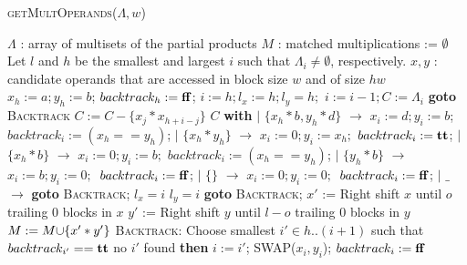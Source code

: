 \begin{algorithm}[!t]
 \caption{\textsc{getMultOperands}($\Lambda,w$)}
 \label{alg:operand}
 \begin{algorithmic}[1]
   \Require $\Lambda$ : array of multisets of the partial products
   \Ensure $M$ : matched multiplications := $\emptyset$
   \State Let $l$ and $h$ be the smallest and largest $i$ such that $\Lambda_i\neq \emptyset$, respectively.
   \State $x,y$ : candidate operands that are accessed in block size $w$ and of size $hw$
   \State $x_h := a; y_h := b$; $backtrack_h := \mathbf{ff}$; 
   \Else
   \State \Return{ $\emptyset$}
   \EndIf
   \State $i := h;l_x := h; l_y = h;$
   \State $i := i - 1; C := \Lambda_i$
    {\bf goto }{\textsc{Backtrack}}
   \State $C := C - \{x_j*x_{h+i-j}\}$
   \EndIf
   \EndFor
    $C$ {\bf with}
   \State\quad $\mid$ $\{x_h*b,y_h*d\}$ $\rightarrow$ $x_i := d; y_i := b$;
   $backtrack_i := (x_h == y_h)$; 
   \State\quad $\mid$ $\{x_h*y_h\}$ $\rightarrow$ $x_i := 0; y_i := x_h;$
   $backtrack_i := \mathbf{tt}$; 
   \State \quad$\mid$ $\{x_h*b\}$ $\rightarrow$ $x_i := 0; y_i := b;$
   $backtrack_i := (x_h == y_h)$; 
   \State \quad $\mid$ $\{y_h*b\}$ $\rightarrow$ $x_i := b; y_i := 0;$\
   $backtrack_i := \mathbf{ff}$; 
   \State \quad $\mid$ $\{\}$ $\rightarrow$ $x_i := 0; y_i := 0;$\
   $backtrack_i := \mathbf{ff}$; 
   \State \quad $\mid$ $\_$ $\rightarrow$ {\bf goto }{\textsc{Backtrack}};
   \IIf{$x_i \neq 0$} $l_x = i$
   \IIf{$y_i \neq 0$} $l_y = i$
    {\bf goto }{\textsc{Backtrack}};
   \If{ $i == 1 $}
   \For{$o \in 0..(l-1)$} %
   \State $x'$ := Right shift $x$ until $o$ trailing $0$ blocks in $x$
   \State $y'$ := Right shift $y$ until $l-o$ trailing $0$ blocks in $y$
   \State $M := M {\cup} \{x' * y'\}$
   \EndFor
   \Else
   \EndIf
   \State \textsc{Backtrack:}
   \State \quad Choose smallest $i' \in h..(i+1)$ such that $backtrack_{i'} == \mathbf{tt}$
   \State \quad {\bf if} no $i'$ found {\bf then} 
   \State \quad $i := i'$; \textsc{SWAP}($x_i,y_i$); $backtrack_{i} := \mathbf{ff}$
   \EndWhile
 \end{algorithmic}
\end{algorithm}  


